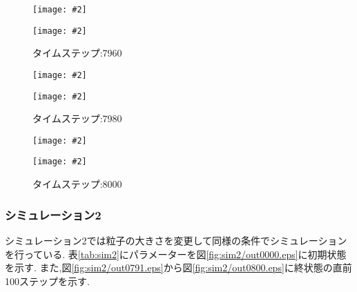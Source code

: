 \documentclass[uplatex,a4j,11pt]{jsarticle}
\makeatletter
\def\fgcaption{\def\@captype{figure}\caption}
\newcommand{\mfig}[3][width=15cm]{
\begin{center}
    \texttt{[image: \#2]}
\fgcaption{#3 \label{fig:#2}}
\end{center}
}
\makeatother
\begin{document}
\begin{figure}[htbp]
    \begin{minipage}{0.5\hsize}
        \mfig[width=7cm]{sim1/out0795.eps}{タイムステップ:7950}
    \end{minipage}
    \begin{minipage}{0.5\hsize}
        \mfig[width=7cm]{sim1/out0796.eps}{タイムステップ:7960}
    \end{minipage} 
\end{figure}
\begin{figure}[htbp]
    \begin{minipage}{0.5\hsize}
        \mfig[width=7cm]{sim1/out0797.eps}{タイムステップ:7970}
    \end{minipage}
    \begin{minipage}{0.5\hsize}
        \mfig[width=7cm]{sim1/out0798.eps}{タイムステップ:7980}
    \end{minipage} 
\end{figure}
\begin{figure}[htbp]
    \begin{minipage}{0.5\hsize}
        \mfig[width=7cm]{sim1/out0799.eps}{タイムステップ:7990}
    \end{minipage}
    \begin{minipage}{0.5\hsize}
        \mfig[width=7cm]{sim1/out0800.eps}{タイムステップ:8000}
    \end{minipage} 
\end{figure}
\subsubsection{シミュレーション2}
シミュレーション2では粒子の大きさを変更して同様の条件でシミュレーションを行っている.
表\ref{tab:sim2}にパラメーターを図\ref{fig:sim2/out0000.eps}に初期状態を示す.
また,図\ref{fig:sim2/out0791.eps}から図\ref{fig:sim2/out0800.eps}に終状態の直前100ステップを示す.
\end{document}
